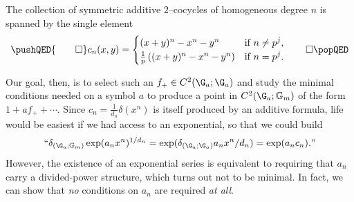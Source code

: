 \begin{corollary}
The collection of symmetric additive \(2\)--cocycles of homogeneous degree \(n\) is spanned by the single element
\[\pushQED{\qed}
c_n(x, y) = \begin{cases} (x + y)^n - x^n - y^n & \text{if \(n \ne p^j\)}, \\ \frac{1}{p} \left( (x + y)^n - x^n - y^n \right) & \text{if \(n = p^j\)}. \end{cases} \qedhere
\popQED\]
\end{corollary}

Our goal, then, is to select such an \(f_+ \in C^2(\G_a; \G_a)\) and study the minimal conditions needed on a symbol \(a\) to produce a point in \(C^2(\G_a; \Gm)\) of the form \(1 + af_+ + \cdots\).
Since \(c_n = \frac{1}{d_n} \delta(x^n)\) is itself produced by an additive formula, life would be easiest if we had access to an exponential, so that we could build \[\text{``\( \delta_{(\G_a; \Gm)} \exp(a_n x^n)^{1/d_n} = \exp(\delta_{(\G_a; \G_a)} a_n x^n / d_n) = \exp(a_n c_n). \)''}\]
However, the existence of an exponential series is equivalent to requiring that \(a_n\) carry a divided-power structure, which turns out not to be minimal.
In fact, we can show that \emph{no} conditions on \(a_n\) are required \emph{at all}.

